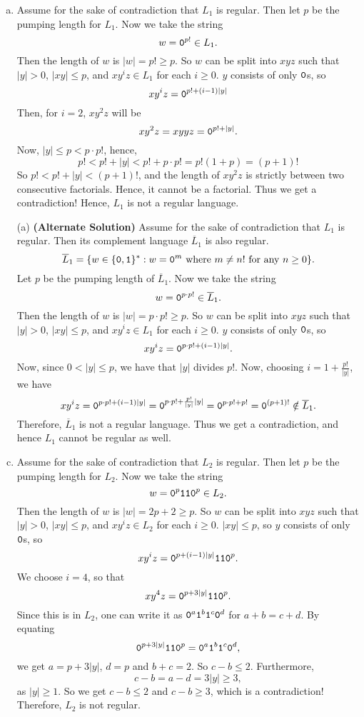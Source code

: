 \documentclass{article}
\begin{document}
\sectionline
\begin{enumerate}[(a)]
\item Assume for the sake of contradiction that \(L_1\) is regular. Then let \(p\) be the pumping length for \(L_1\). Now we take the string 
\[ w = \texttt{0}^{p!} \in L_1. \]
Then the length of \(w\) is \(|w| = p! \geq p\). So \(w\) can be split into \(xyz\) such that \(|y| > 0\), \(|xy| \leq p\), and \(xy^iz \in L_1\) for each \(i \geq 0\). \(y\) consists of only \(\texttt{0}\)s, so 
\[ xy^i z = \texttt{0}^{p! + (i-1) |y| } \]
Then, for \(i=2\), \(xy^2z\) will be 
\[ xy^2z = xyyz = \texttt{0}^{p! + |y|} .  \]
Now, \(|y| \le p < p \cdot p! \), hence, 
\[ p! < p! + |y| < p!  + p \cdot p! = p! \left(1+p\right) = (p+1)! \]
So \(p! < p! + |y| < (p+1)!\), and the length of \(xy^2z\) is strictly between two consecutive factorials. Hence, it cannot be a factorial. 
Thus we get a contradiction! Hence, \(L_1\) is not a regular language. 

\item[(a)] \textbf{(Alternate Solution)} Assume for the sake of contradiction that \(L_1\) is regular. Then its complement language \(\overline L_1\) is also regular. 
\[ \overline L_1 = \{ w \in \{\texttt{0}, \texttt{1}\}^* : w = \texttt{0}^{m} \text{ where } m \ne n! \text{ for any } n \ge 0 \} . \]
Let \(p\) be the pumping length of \(\overline L_1\). Now we take the string 
\[w = \texttt{0} ^{p \cdot p!} \in \overline L_1 . \]
Then the length of \(w\) is \(|w| = p \cdot p! \geq p\). So \(w\) can be split into \(xyz\) such that \(|y| > 0\), \(|xy| \leq p\), and \(xy^iz \in L_1\) for each \(i \geq 0\). \(y\) consists of only \(\texttt{0}\)s, so 
\[ xy^i z = \texttt{0}^{p \cdot p! + (i-1) |y| } . \]
Now, since \(0 < |y| \le p\), we have that \(|y|\) divides \( p! \). Now, choosing \(i = 1 + \frac{p!}{|y|}\), we have 
\[ xy^i z = \texttt{0}^{p \cdot p! + (i-1) |y| } 
= \texttt{0}^{p \cdot p! + \frac{p!}{|y|} |y| } 
= \texttt{0} ^{p \cdot p! + p! }
= \texttt{0} ^{(p+1)! } \notin \overline L_1 . \]
Therefore, \(\overline L_1\) is not a regular language. Thus we get a contradiction, and hence \(L_1\) cannot be regular as well. 

\item Assume for the sake of contradiction that \(L_2\) is regular. Then let \(p\) be the pumping length for \(L_2\). Now we take the string 
\[ w = \texttt{0}^{p} \texttt{1} \texttt{1} \texttt{0}^p \in L_2. \]
Then the length of \(w\) is \(|w| = 2p+2 \geq p\). So \(w\) can be split into \(xyz\) such that \(|y| > 0\), \(|xy| \leq p\), and \(xy^iz \in L_2\) for each \(i \geq 0\). \(|xy| \le p\), so \(y\) consists of only \(\texttt{0}\)s, so 
\[ xy^i z = \texttt{0}^{p + (i-1) |y| } \texttt{1} \texttt{1} \texttt{0}^p . \]
We choose \(i=4\), so that 
\[ xy^4 z = \texttt{0}^{p + 3 |y| } \texttt{1} \texttt{1} \texttt{0}^p . \]
Since this is in \(L_2\), one can write it as \(\texttt{0}^a\texttt{1}^b\texttt{1}^c \texttt{0}^d\) for \(a+b=c+d\). By equating 
\[ \texttt{0}^{p + 3 |y| } \texttt{1} \texttt{1} \texttt{0}^p = \texttt{0}^a\texttt{1}^b\texttt{1}^c \texttt{0}^d ,  \]
we get \(a= p + 3 |y|\), \(d = p\) and \(b+c=2\). So \(c-b \le 2\). Furthermore, 
\[ c-b = a-d =  3 |y| \ge 3 ,  \]
as \(|y| \ge 1\). So we get \(c-b \le 2\) and \(c-b \ge 3\), which is a contradiction! Therefore, \(L_2\) is not regular. 


\end{enumerate}
\end{document}
